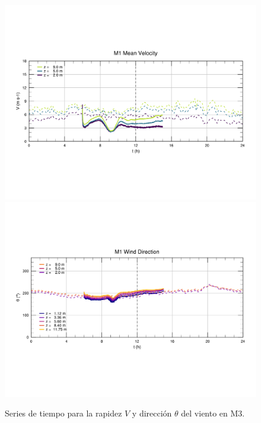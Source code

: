 \begin{figure}[H]
	\centering
	\includegraphics[width=0.87\linewidth,page=3,trim={9mm 57mm 10mm 60mm},clip]{Imagenes/06/bol/ts_interpol_compare.pdf}\\%
	\includegraphics[width=0.87\linewidth,page=3,trim={12mm 52mm 10mm 60mm},clip]{Imagenes/06/bol/ts_interpol_compare_o.pdf}%
	\vspace{-2mm}\caption{Series de tiempo para la rapidez $V$ y dirección $\theta$ del viento en M3.}
	\label{fig:06_bol_ts_m3}
\end{figure}
\vspace*{\fill}
